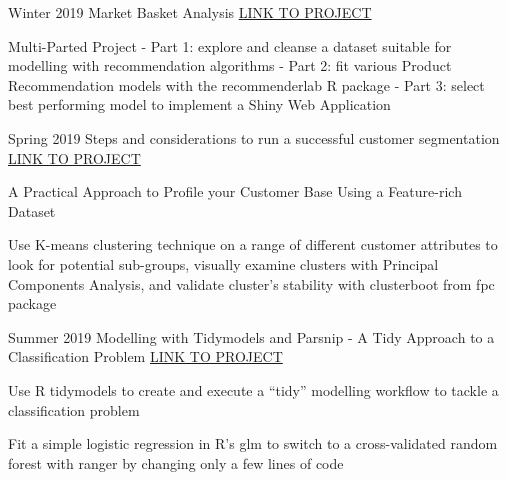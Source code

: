 

\begin{cventries}

  \cventry
    {Winter 2019} %
    {Market Basket Analysis} %
    {\href{https://diegousai.io/2019/03/market-basket-analysis-part-2-of-3}{LINK TO PROJECT}} %
    {} %
    {
      \begin{cvitems} %
        \item {Multi-Parted Project - Part 1: explore and cleanse a dataset suitable for modelling with recommendation algorithms - Part 2: fit various Product Recommendation models with the recommenderlab R package - Part 3: select best performing model to implement a Shiny Web Application}
      \end{cvitems}
    }

  \cventry
    {Spring 2019} %
    {Steps and considerations to run a successful customer segmentation} %
    {\href{https://diegousai.io/2019/09/steps-and-considerations-to-run-a-successful-segmentation}{LINK TO PROJECT}} %
    {} %
    {
      \begin{cvitems} %
        \item {A Practical Approach to Profile your Customer Base Using a Feature-rich Dataset}
        \item {Use K-means clustering technique on a range of different customer attributes to look for potential sub-groups, visually examine clusters with Principal Components Analysis, and validate cluster’s stability with clusterboot from fpc package}
      \end{cvitems}
    }
    
  \cventry
    {Summer 2019} %
    {Modelling with Tidymodels and Parsnip - A Tidy Approach to a Classification Problem} %
    {\href{https://diegousai.io/2019/09/modelling-with-tidymodels-and-parsnip}{LINK TO PROJECT}} %
    {} %
    {
      \begin{cvitems} %
        \item {Use R tidymodels to create and execute a “tidy” modelling workflow to tackle a classification problem}
        \item {Fit a simple logistic regression in R’s glm to switch to a cross-validated random forest with ranger by changing only a few lines of code}
      \end{cvitems}
    }


\end{cventries}
